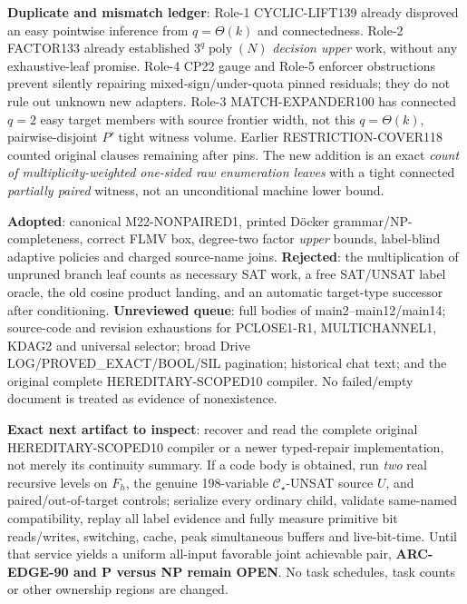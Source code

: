 \documentclass[11pt]{article}
\newcommand{\CS}{\mathcal C_\star}
\begin{document}
\textbf{Duplicate and mismatch ledger}: Role-1 CYCLIC-LIFT139 already disproved an easy pointwise inference from \(q=\Theta(k)\) and connectedness. Role-2 FACTOR133 already established \(3^q\operatorname{poly}(N)\) \emph{decision upper} work, without any exhaustive-leaf promise. Role-4 CP22 gauge and Role-5 enforcer obstructions prevent silently repairing mixed-sign/under-quota pinned residuals; they do not rule out unknown new adapters. Role-3 MATCH-EXPANDER100 has connected \(q=2\) easy target members with source frontier width, not this \(q=\Theta(k)\), pairwise-disjoint \(P'\) tight witness volume. Earlier RESTRICTION-COVER118 counted original clauses remaining after pins. The new addition is an exact \emph{count of multiplicity-weighted one-sided raw enumeration leaves} with a tight connected \emph{partially paired} witness, not an unconditional machine lower bound.

\textbf{Adopted}: canonical M22-NONPAIRED1, printed Döcker grammar/NP-completeness, correct FLMV box, degree-two factor \emph{upper} bounds, label-blind adaptive policies and charged source-name joins. \textbf{Rejected}: the multiplication of unpruned branch leaf counts as necessary SAT work, a free SAT/UNSAT label oracle, the old cosine product landing, and an automatic target-type successor after conditioning. \textbf{Unreviewed queue}: full bodies of main2--main12/main14; source-code and revision exhaustions for PCLOSE1-R1, MULTICHANNEL1, KDAG2 and universal selector; broad Drive LOG/PROVED\_EXACT/BOOL/SIL pagination; historical chat text; and the original complete HEREDITARY-SCOPED10 compiler. No failed/empty document is treated as evidence of nonexistence.

\textbf{Exact next artifact to inspect}: recover and read the complete original HEREDITARY-SCOPED10 compiler or a newer typed-repair implementation, not merely its continuity summary. If a code body is obtained, run \emph{two} real recursive levels on \(F_h\), the genuine 198-variable \(\CS\)-UNSAT source \(U\), and paired/out-of-target controls; serialize every ordinary child, validate same-named compatibility, replay all label evidence and fully measure primitive bit reads/writes, switching, cache, peak simultaneous buffers and live-bit-time. Until that service yields a uniform all-input favorable joint achievable pair, \textbf{ARC-EDGE-90 and P versus NP remain OPEN}. No task schedules, task counts or other ownership regions are changed.
\end{document}
